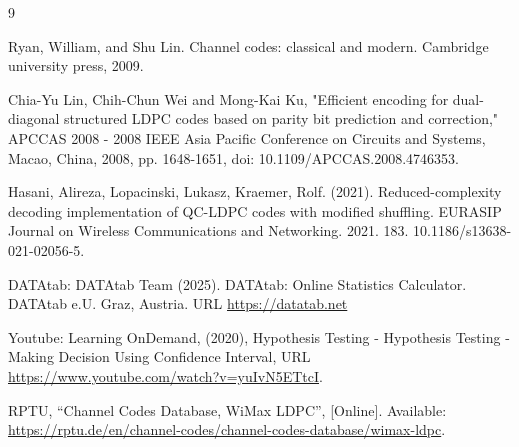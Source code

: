 \documentclass[12pt]{scrreprt}
\begin{document}
	\begin{thebibliography}{9}
		
		Ryan, William, and Shu Lin. Channel codes: classical and modern. Cambridge university press, 2009.
		
		Chia-Yu Lin, Chih-Chun Wei and Mong-Kai Ku, "Efficient encoding for dual-diagonal structured LDPC codes based on parity bit prediction and correction," APCCAS 2008 - 2008 IEEE Asia Pacific Conference on Circuits and Systems, Macao, China, 2008, pp. 1648-1651, doi: 10.1109/APCCAS.2008.4746353.
		
		
		Hasani, Alireza, Lopacinski, Lukasz, Kraemer, Rolf. (2021). Reduced-complexity decoding implementation of QC-LDPC codes with modified shuffling. EURASIP Journal on Wireless Communications and Networking. 2021. 183. 10.1186/s13638-021-02056-5. 
		
		DATAtab: DATAtab Team (2025). DATAtab: Online Statistics Calculator. DATAtab e.U. Graz, Austria. URL \url{https://datatab.net}
		
		Youtube: Learning OnDemand, (2020), Hypothesis Testing - Hypothesis Testing - Making Decision Using Confidence Interval, URL \url{https://www.youtube.com/watch?v=yuIvN5ETtcI}.
		
		RPTU, ``Channel Codes Database, WiMax LDPC'', [Online]. Available: \url{https://rptu.de/en/channel-codes/channel-codes-database/wimax-ldpc}.
		
	\end{thebibliography}
	
\end{document}
